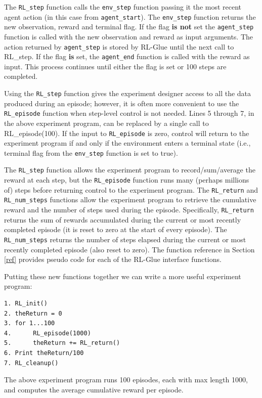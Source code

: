 \documentclass[11pt]{article}
\begin{document}
The \texttt{RL\_step} function calls the \texttt{env\_step} function passing it the most recent agent action (in this case from \texttt{agent\_start}). The \texttt{env\_step} function returns the new observation, reward and terminal flag. If the flag {\bf is not} set the \texttt{agent\_step} function is called with the new observation and reward as input arguments. The action returned by \texttt{agent\_step} is stored by RL-Glue until the next call to RL\_step. If the flag {\bf is} set, the \texttt{agent\_end} function is called with the reward as input. This process continues until either the flag is set or 100 steps are completed. 

Using the \texttt{RL\_step} function gives the experiment designer access to all the data produced during an episode; however, it is often more convenient to use the \texttt{RL\_episode} function when step-level control is not needed. Lines 5 through 7, in the above experiment program, can be replaced by a single call to RL\_episode(100). If the input to \texttt{RL\_episode} is zero, control will return to the experiment program if and only if the environment enters a terminal state (i.e., terminal flag from the \texttt{env\_step} function is set to true).

The \texttt{RL\_step} function allows the experiment program to record/sum/average the reward at each step, but the \texttt{RL\_episode} function runs many (perhaps millions of) steps before returning control to the experiment program. The \texttt{RL\_return} and \texttt{RL\_num\_steps} functions allow the experiment program to retrieve the cumulative reward and the number of steps used during the episode. Specifically, \texttt{RL\_return} returns the sum of rewards accumulated during the current or most recently completed episode (it is reset to zero at the start of every episode). The \texttt{RL\_num\_steps} returns the number of steps elapsed during the current or most recently completed episode (also reset to zero). The function reference in Section \ref{ref} provides pseudo code for each of the RL-Glue interface functions.

Putting these new functions together we can write a more useful experiment program:
\begin{verbatim}
1. RL_init()
2. theReturn = 0
3. for 1...100
4.      RL_episode(1000)
5.      theReturn += RL_return()
6. Print theReturn/100
7. RL_cleanup()
\end{verbatim}
The above experiment program runs 100 episodes, each with max length 1000, and computes the average cumulative reward per episode.
\end{document}
